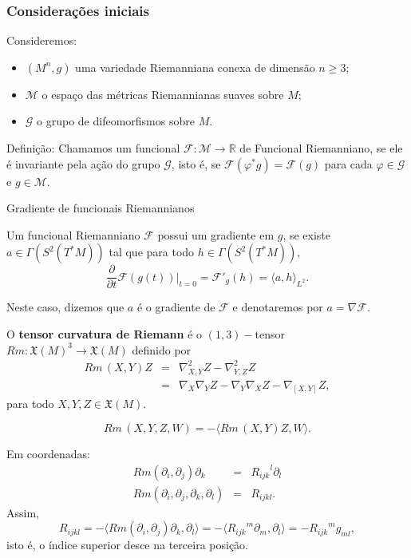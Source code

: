\documentclass[blue]{beamer}
\begin{document}

\begin{frame}
\centerslidesfalse \frametitle{Considerações iniciais}
\pause
Consideremos:
\begin{itemize}
	\item $(M^n, g)$ uma variedade Riemanniana conexa de dimensão $n\geq 3$;\pause
	\item $\mathcal{M}$  o espaço das métricas Riemannianas suaves sobre $M$;\pause
	\item $\mathcal{G}$ o grupo de difeomorfismos sobre $M$.\pause
\end{itemize}
\begin{block}{Definição:}
Chamamos um funcional $\mathcal{F}: \mathcal{M} \rightarrow \mathbb{R}$ de Funcional Riemanniano, se ele é invariante pela ação do grupo $\mathcal{G}$, isto é, se $\mathcal{F}(\varphi^{\ast}g)= \mathcal{F}(g)$ para cada $\varphi\in \mathcal{G}$ e $g\in \mathcal{M}$.
\end{block}
\end{frame}



\begin{frame}{Gradiente de funcionais Riemannianos}\pause
\begin{definition}
	Um funcional Riemanniano $\mathcal{F}$ possui um gradiente em $g$, se existe $a\in \Gamma(S^{2}(T^{\ast}M))$ tal que para todo  $h\in \Gamma(S^{2}(T^{\ast}M))$,
	$$\frac{\partial}{\partial t}\mathcal{F}(g(t))\Big|_{t=0} =\mathcal{F}'_{g}(h)=\langle a, h\rangle_{L^2}.$$
\end{definition}\pause
Neste caso, dizemos que $a$ é o gradiente de $\mathcal{F}$ e denotaremos por $a=\nabla \mathcal{F}$.
\end{frame}

\begin{frame}
O \textbf{tensor curvatura de Riemann} é o $(1,3)-$tensor $ Rm:\mathfrak{X}(M)^3\rightarrow\mathfrak{X}(M)$ definido por
\begin{eqnarray*}
	Rm\,(X,Y)Z&=&\nabla_{X,Y}^{2}Z-\nabla_{Y,Z}^{2}Z\\
	&=&\nabla_{X}\nabla_{Y}Z-\nabla_{Y}\nabla_{X}Z-\nabla_{[X,Y]}Z,
\end{eqnarray*}
para todo $X,Y,Z\in\mathfrak{X}(M).$\pause

\begin{equation*}
Rm\,(X,Y,Z,W)=-\langle Rm\,(X,Y)Z,W\rangle.
\end{equation*}\pause

Em coordenadas:
\begin{eqnarray*}
	Rm(\partial_{i}, \partial_{j})\partial_{k} &=&{R_{ijk}}^{l}\partial_{l}\\
	Rm(\partial_{i}, \partial_{j}, \partial_{k}, \partial_{l}) &=&R_{ijkl}. 
\end{eqnarray*}
Assim,
\begin{equation*}
R_{ijkl} = - \langle Rm(\partial_{i}, \partial_{j})\partial_{k} , \partial_{l}\rangle = -\langle {R_{ijk}}^{m}\partial_{m}, \partial_{l}\rangle = -{R_{ijk}}^{m}g_{ml}, 
\end{equation*}
isto é, o índice superior desce na terceira posição. 
\end{frame}
\end{document}
